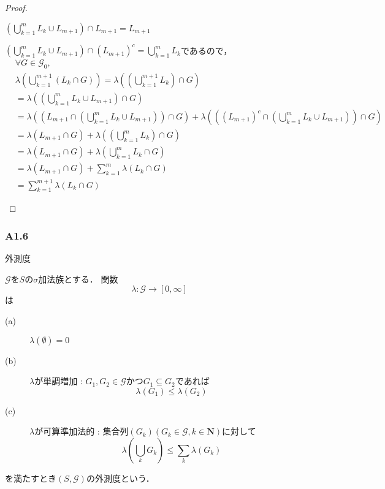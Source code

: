 \documentclass{jsarticle}
\begin{document}
\begin{proof}
\begin{itembox}{}
    $\left( \bigcup_{k=1}^{m} L_k \cup L_{m+1} \right) \cap L_{m+1} = L_{m+1}$
    
    $\left( \bigcup_{k=1}^{m} L_k \cup L_{m+1} \right) \cap (L_{m+1})^c =  \bigcup_{k=1}^{m} L_k$であるので，
    \begin{align}
        &\forall G\in\mathcal{G}_0 \nonumber, \\ 
        &\lambda\left( \bigcup_{k=1}^{m+1} (L_k\cap G) \right) = \lambda\left( \left(\bigcup_{k=1}^{m+1} L_k\right) \cap G \right) \nonumber \\
        &= \lambda\left( \left(\bigcup_{k=1}^{m} L_k \cup L_{m+1} \right) \cap G \right) \nonumber \\
        &= \lambda\left( \left(L_{m+1} \cap \left(\bigcup_{k=1}^{m} L_k \cup L_{m+1} \right) \right) \cap G \right) + \lambda\left( \left( (L_{m+1})^c \cap \left(\bigcup_{k=1}^{m} L_k \cup L_{m+1} \right) \right) \cap G \right) \nonumber \\
        &= \lambda\left( L_{m+1} \cap G \right) + \lambda\left( \left( \bigcup_{k=1}^{m} L_k \right) \cap G \right) \nonumber \\
        &= \lambda\left( L_{m+1} \cap G \right) + \lambda\left( \bigcup_{k=1}^{m} L_k \cap G\right) \nonumber \\
        &= \lambda\left( L_{m+1} \cap G \right) + \sum_{k=1}^m \lambda(L_k\cap G) \nonumber \\
        &= \sum_{k=1}^{m+1} \lambda(L_k\cap G) \nonumber
    \end{align}
\end{itembox}

\end{proof}

\subsubsection*{A1.6}
外測度

$\mathcal{G}$を$S$の$\sigma$加法族とする．
関数
\begin{equation}
    \lambda\colon\mathcal{G}\to[0,\infty] \nonumber
\end{equation}
は
\begin{description}
    \item[(a)] $\lambda(\emptyset)=0$
    \item[(b)] $\lambda$が単調増加 : $G_1,G_2\in\mathcal{G}$かつ$G_1\subseteq G_2$であれば
        \begin{equation}
            \lambda(G_1)\leq\lambda(G_2)
        \end{equation}
    \item[(c)] $\lambda$が可算準加法的 : 集合列$(G_k) (G_k\in\mathcal{G},k\in\mathbf{N})$に対して
        \begin{equation}
            \lambda \left( \bigcup_k G_k \right) \leq \sum_k \lambda(G_k)
        \end{equation}
\end{description}
を満たすとき$(S,\mathcal{G})$の外測度という．
\end{document}
